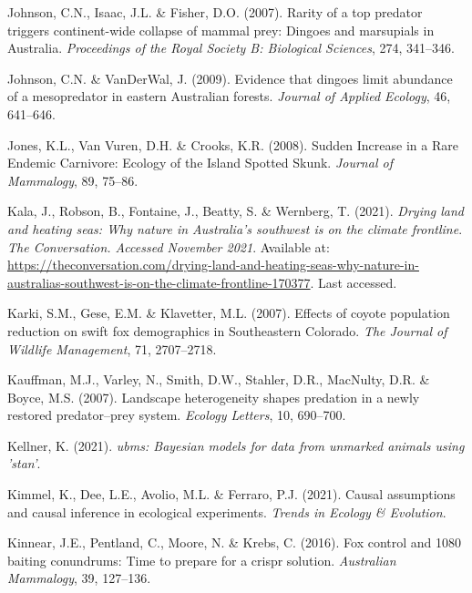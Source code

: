 \documentclass[11pt,a4paper,titlepage,twoside,openright]{style/unimelbthesis}
\begin{document}
\begin{mainmatter}
\leavevmode\hypertarget{ref-johnson2007rarity}{}%
Johnson, C.N., Isaac, J.L. \& Fisher, D.O. (2007). Rarity of a top predator triggers continent-wide collapse of mammal prey: Dingoes and marsupials in Australia. \emph{Proceedings of the Royal Society B: Biological Sciences}, 274, 341--346.

\leavevmode\hypertarget{ref-johnson2009evidence}{}%
Johnson, C.N. \& VanDerWal, J. (2009). Evidence that dingoes limit abundance of a mesopredator in eastern Australian forests. \emph{Journal of Applied Ecology}, 46, 641--646.

\leavevmode\hypertarget{ref-jones2008sudden}{}%
Jones, K.L., Van Vuren, D.H. \& Crooks, K.R. (2008). Sudden Increase in a Rare Endemic Carnivore: Ecology of the Island Spotted Skunk. \emph{Journal of Mammalogy}, 89, 75--86.

\leavevmode\hypertarget{ref-drying2021kala}{}%
Kala, J., Robson, B., Fontaine, J., Beatty, S. \& Wernberg, T. (2021). \emph{Drying land and heating seas: Why nature in Australia's southwest is on the climate frontline}. \emph{The Conversation. Accessed November 2021}. Available at: \url{https://theconversation.com/drying-land-and-heating-seas-why-nature-in-australias-southwest-is-on-the-climate-frontline-170377}. Last accessed.

\leavevmode\hypertarget{ref-karki2007effects}{}%
Karki, S.M., Gese, E.M. \& Klavetter, M.L. (2007). Effects of coyote population reduction on swift fox demographics in Southeastern Colorado. \emph{The Journal of Wildlife Management}, 71, 2707--2718.

\leavevmode\hypertarget{ref-kauffman2007landscape}{}%
Kauffman, M.J., Varley, N., Smith, D.W., Stahler, D.R., MacNulty, D.R. \& Boyce, M.S. (2007). Landscape heterogeneity shapes predation in a newly restored predator--prey system. \emph{Ecology Letters}, 10, 690--700.

\leavevmode\hypertarget{ref-ubms}{}%
Kellner, K. (2021). \emph{ubms: Bayesian models for data from unmarked animals using 'stan'}.

\leavevmode\hypertarget{ref-kimmel2021causal}{}%
Kimmel, K., Dee, L.E., Avolio, M.L. \& Ferraro, P.J. (2021). Causal assumptions and causal inference in ecological experiments. \emph{Trends in Ecology \& Evolution}.

\leavevmode\hypertarget{ref-kinnear2016fox}{}%
Kinnear, J.E., Pentland, C., Moore, N. \& Krebs, C. (2016). Fox control and 1080 baiting conundrums: Time to prepare for a crispr solution. \emph{Australian Mammalogy}, 39, 127--136.


\end{mainmatter}
\end{document}
